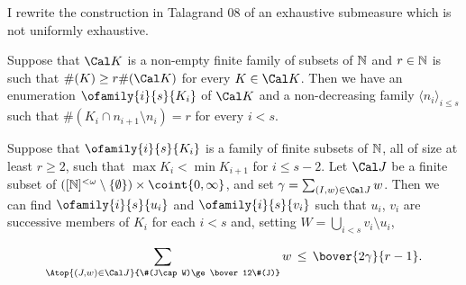 
\def\chaptername{Measurable algebras}
\def\sectionname{Talagrand's example}

\def\sbcc{$\sigma$-bounded-cc}
\def\sfcc{$\sigma$-finite-cc}


I rewrite the construction in {\smc Talagrand 08} of an
exhaustive submeasure which is not uniformly exhaustive.

Suppose that $\Cal K$ is a non-empty finite family of subsets
of $\Bbb N$ and $r\in\Bbb N$ is such that $\#(K)\ge r\#(\Cal K)$ for every
$K\in\Cal K$.   Then we have an enumeration $\ofamily{i}{s}{K_i}$ of 
$\Cal K$ and a
non-decreasing family $\langle n_i\rangle_{i\le s}$ such that
$\#(K_i\cap n_{i+1}\setminus n_i)=r$ for every $i<s$.


Suppose that $\ofamily{i}{s}{K_i}$ is a family of finite subsets of 
$\Bbb N$, all of size at least $r\ge 2$,
such that $\max K_i<\min K_{i+1}$ for $i\le s-2$.   Let
$\Cal J$ be a finite subset of
$([\Bbb N]^{<\omega}\setminus\{\emptyset\})\times\coint{0,\infty}$,
and set $\gamma=\sum_{(I,w)\in\Cal J}w$.   Then we can find 
$\ofamily{i}{s}{u_i}$ and $\ofamily{i}{s}{v_i}$ such that
$u_i$, $v_i$ are successive members of $K_i$ for each $i<s$ and, setting
$W=\bigcup_{i<s}v_i\setminus u_i$,

$$\sum_{\Atop{(J,w)\in\Cal J}{\#(J\cap W)\ge\bover12\#(J)}}w
\,\le\,\bover{2\gamma}{r-1}.$$

